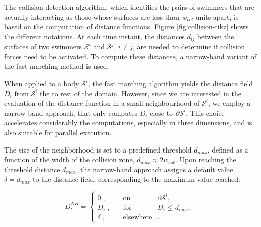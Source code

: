 \documentclass[graybox]{svmult}
\newcommand{\Solid}{\mathcal{S}} %
\begin{document}
The collision detection algorithm, which identifies the pairs of swimmers that are actually interacting as those whose surfaces are less than $w_{col}$ units apart, is based on the computation of distance functions. Figure \ref{fig:collision-tikz} shows the different notations. 
At each time instant, the distances $d_{ij}$ between the surfaces of two swimmers $\Solid^i$ and $\Solid^j$, $i \ne j$, are needed to determine if collision forces need to be activated. To compute these distances, a narrow-band variant of the fast marching method is used. 

When applied to a body $\Solid^i$, the  fast marching algorithm \cite{sethian_fast_1996} yields the distance field $D_i$ from $\Solid^i$ the to rest of the domain. However, since we are interested in the evaluation of the distance function in a small neighbourhood of $\Solid^i$, we employ a narrow-band approach, that only computes $D_i$ close to $\partial \Solid^i$. This choice accelerates considerably the computations, especially in three dimensions, and is also suitable for parallel execution.

The size of the neighborhood is set to a predefined threshold $d_{max}$, defined as a function of the width of the collision zone, $d_{max} \approx 2 w_{col}$. Upon reaching the threshold distance $d_{max}$, the narrow-band 
approach assigns a default value $\delta = d_{max}$ to the distance field, corresponding to the maximum value reached:
\begin{center}
	\begin{equation*}
		D_i^{NB} = \left\{\begin{array}{rcl}
		0 \;, \quad &\mbox{on }& \partial \Solid^i , \\
		D_i \;, \quad &\mbox{for }& D_i \leq d_{max} ,\\
		\delta\;, \quad &\mbox{elsewhere}&   .
		\end{array}\right.\;
	\end{equation*}
\end{center}
\end{document}
